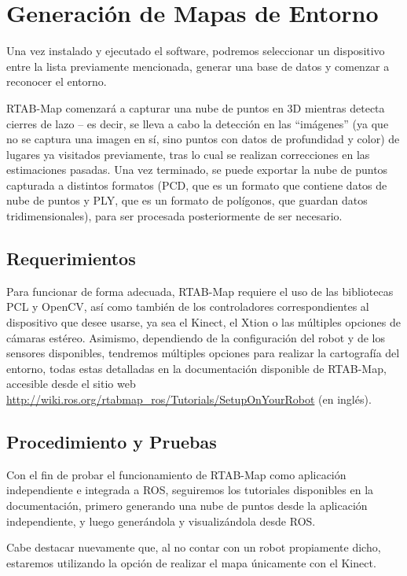 \section{Generación de Mapas de Entorno}

Una vez instalado y ejecutado el software, podremos seleccionar un dispositivo entre la lista previamente mencionada, generar una base de datos y comenzar a reconocer el entorno.

RTAB-Map comenzará a capturar una nube de puntos en 3D mientras detecta cierres de lazo -- es decir, se lleva a cabo la detección en las ``imágenes'' (ya que no se captura una imagen en sí, sino puntos con datos de profundidad y color) de lugares ya visitados previamente, tras lo cual se realizan correcciones en las estimaciones pasadas. Una vez terminado, se puede exportar la nube de puntos capturada a distintos formatos (PCD, que es un formato que contiene datos de nube de puntos \cite{pcdformat} y PLY, que es un formato de polígonos, que guardan datos tridimensionales), para ser procesada posteriormente de ser necesario.

\subsection{Requerimientos}

Para funcionar de forma adecuada, RTAB-Map requiere el uso de las bibliotecas PCL y OpenCV, así como también de los controladores correspondientes al dispositivo que desee usarse, ya sea el Kinect, el Xtion o las múltiples opciones de cámaras estéreo. Asimismo, dependiendo de la configuración del robot y de los sensores disponibles, tendremos múltiples opciones para realizar la cartografía del entorno, todas estas detalladas en la documentación disponible de RTAB-Map, accesible desde el sitio web \url{http://wiki.ros.org/rtabmap_ros/Tutorials/SetupOnYourRobot} (en inglés).

\subsection{Procedimiento y Pruebas}

Con el fin de probar el funcionamiento de RTAB-Map como aplicación independiente e integrada a ROS, seguiremos los tutoriales disponibles en la documentación, primero generando una nube de puntos desde la aplicación independiente, y luego generándola y visualizándola desde ROS.

Cabe destacar nuevamente que, al no contar con un robot propiamente dicho, estaremos utilizando la opción de realizar el mapa únicamente con el Kinect.


